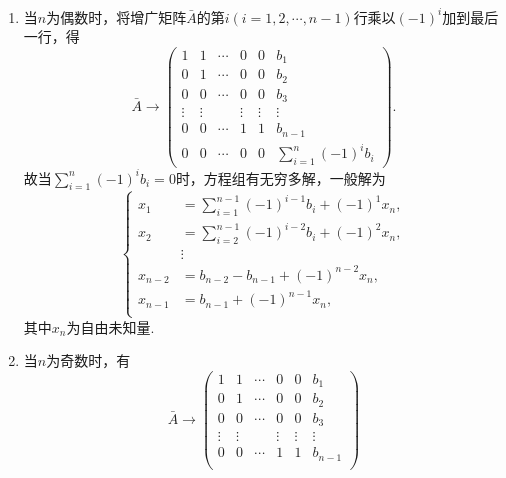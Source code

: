 \begin{enumerate}
        \begin{enumerate}
            \item
                当$n$为偶数时，将增广矩阵$\bar{A}$的第$i(i=1,2,\cdots,n-1)$行乘以$(-1)^i$加到最后一行，得
                \begin{equation*}
                    \bar{A}\rightarrow\begin{pmatrix}
                        1 & 1 & \cdots & 0 & 0 & b_1 \\
                        0 & 1 & \cdots & 0 & 0 & b_2 \\
                        0 & 0 & \cdots & 0 & 0 & b_3 \\
                        \vdots & \vdots &  & \vdots & \vdots & \vdots \\
                        0 & 0 & \cdots & 1 & 1 & b_{n-1} \\
                        0 & 0 & \cdots & 0 & 0 & \sum\limits_{i=1}^{n}(-1)^ib_i
                    \end{pmatrix}.
                \end{equation*}
                故当$\sum\limits_{i=1}^{n}(-1)^ib_i=0$时，方程组有无穷多解，一般解为
                $$\begin{cases}
                    x_1&=\sum\limits_{i=1}^{n-1}(-1)^{i-1}b_i+(-1)^1x_n, \\
                    x_2&=\sum\limits_{i=2}^{n-1}(-1)^{i-2}b_i+(-1)^2x_n, \\
                    &\vdots \\
                    x_{n-2}&=b_{n-2}-b_{n-1}+(-1)^{n-2}x_n, \\
                    x_{n-1}&=b_{n-1}+(-1)^{n-1}x_n, \\
                \end{cases}$$
                其中$x_n$为自由未知量.\\
            \item
                当$n$为奇数时，有
                \begin{equation*}
                    \bar{A}\rightarrow\begin{pmatrix}
                        1 & 1 & \cdots & 0 & 0 & b_1 \\
                        0 & 1 & \cdots & 0 & 0 & b_2 \\
                        0 & 0 & \cdots & 0 & 0 & b_3 \\
                        \vdots & \vdots &  & \vdots & \vdots & \vdots \\
                        0 & 0 & \cdots & 1 & 1 & b_{n-1} \\

\end{pmatrix}
\end{equation*}
\end{enumerate}
\end{enumerate}
